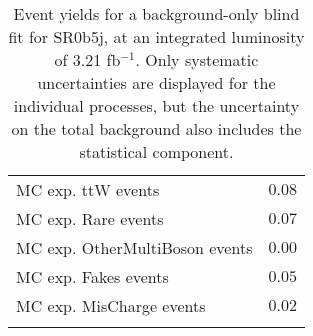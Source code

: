 \begin{table}
\begin{center}
{\begin{tabular*}{\textwidth}{@{\extracolsep{\fill}}lr}
        MC exp. ttW events         & $0.08$              \\
        MC exp. Rare events         & $0.07$              \\
        MC exp. OtherMultiBoson events         & $0.00$              \\
        MC exp. Fakes events         & $0.05$              \\
        MC exp. MisCharge events         & $0.02$              \\
\noalign{\smallskip}\hline\noalign{\smallskip}
\end{tabular*}
}

\end{center}
\caption{Event yields for a background-only blind fit for SR0b5j, at an integrated luminosity of 3.21 fb$^{-1}$. Only systematic uncertainties are displayed for the individual processes, but the uncertainty on the total background also includes the statistical component.}
\label{tab:histfitter:yields:bgonly:SR0b5j}
\end{table}
%


